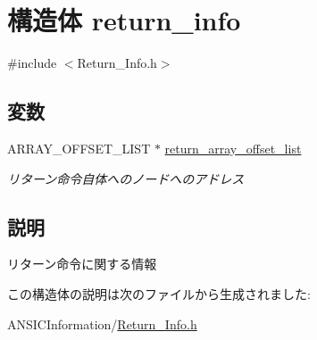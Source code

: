 \hypertarget{structreturn__info}{
\section{構造体 return\_\-info}
\label{structreturn__info}
}


{\ttfamily \#include $<$Return\_\-Info.h$>$}

\subsection*{変数}
\begin{DoxyCompactItemize}
\item 
\hypertarget{structreturn__info_a4a73b7eb55cc8db61c9175f7f0d98a40}{
ARRAY\_\-OFFSET\_\-LIST $\ast$ \hyperlink{structreturn__info_a4a73b7eb55cc8db61c9175f7f0d98a40}{return\_\-array\_\-offset\_\-list}}
\label{structreturn__info_a4a73b7eb55cc8db61c9175f7f0d98a40}

\begin{DoxyCompactList}\small\item\em リターン命令自体へのノードへのアドレス \item\end{DoxyCompactList}\end{DoxyCompactItemize}


\subsection{説明}
リターン命令に関する情報 

この構造体の説明は次のファイルから生成されました:\begin{DoxyCompactItemize}
\item 
ANSICInformation/\hyperlink{Return__Info_8h}{Return\_\-Info.h}\end{DoxyCompactItemize}
